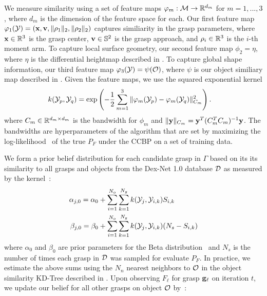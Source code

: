 We measure similarity using a set of feature maps $\varphi_m: \mathcal{M} \rightarrow \mathbb{R}^{d_m}$ for $m = 1, ..., 3$, where $d_m$ is the dimension of the feature space for each.
Our first feature map $\varphi_{1}(\mathcal{Y}) = (\mathbf{x}, \mathbf{v}, \| \rho_1 \|_2, \| \rho_2 \|_2)$ captures similiarity in the grasp parameters, where $\mathbf{x} \in \mathbb{R}^3$ is the grasp center, $\mathbf{v} \in \mathbb{S}^2$ is the grasp approach, and $\rho_i \in \mathbb{R}^3$ is the $i$-th moment arm.
To capture local surface geometry, our second feature map $\phi_{2} = \eta$, where $\eta$ is the differential heightmap described in .
To capture global shape information, our third feature map $\varphi_{3}(\mathcal{Y}) = \psi(\mathcal{O})$, where $\psi$ is our object similiary map described in .
Given the feature maps, we use the squared exponential kernel 
\begin{align*}
	k(\mathcal{Y}_p, \mathcal{Y}_q) &= \exp\left( - \frac{1}{2} \sum \limits_{m=1}^{3} \|\varphi_m(\mathcal{Y}_p) - \varphi_m(\mathcal{Y}_q)\|_{C_m}^2 \right).
\end{align*}
\noindent where $C_m \in \mathbb{R}^{d_m \times d_m}$ is the bandwidth for $\phi_m$ and $\| \mathbf{y} \|_{C_m} = \mathbf{y}^T (C_m^T C_m)^{-1} \mathbf{y}$.
The bandwidths are hyperparameters of the algorithm that are set by maximizing the log-likelihood~\cite{goetschalckx2011continuous} of the true $P_F$ under the CCBP on a set of training data.

We form a prior belief distribution for each candidate grasp in $\Gamma$ based on its its similarity to all grasps and objects from the Dex-Net 1.0 database $\mathcal{D}$ as measured by the kernel~\cite{goetschalckx2011continuous}:
\begin{align}
	\alpha_{j,0} = \alpha_{0} & + \sum \limits_{i=1}^{N_o} \sum \limits_{k=1}^{N_g} k(\mathcal{Y}_{j}, \mathcal{Y}_{i, k}) S_{i,k} \label{eq:alpha-prior} \\
	\beta_{j,0} = \beta_{0} & + \sum \limits_{i=1}^{N_o} \sum \limits_{k=1}^{N_g}  k(\mathcal{Y}_{j}, \mathcal{Y}_{i,k}) (N_s - S_{i,k}) \label{eq:beta-prior}
\end{align}
\noindent where $\alpha_{0}$ and $\beta_{0}$ are prior parameters for the Beta distribution~\cite{laskey2015bandits} and $N_s$ is the number of times each grasp in $\mathcal{D}$ was sampled for evaluate $P_F$.
In practice, we estimate the above sums using the $N_n$ nearest neighbors to $\mathcal{O}$ in the object similarity KD-Tree described in .
Upon observing $F_{\ell}$ for grasp $\mathbf{g}_{\ell}$ on iteration $t$, we update our belief for all other grasps on object $\mathcal{O}$ by~\cite{goetschalckx2011continuous}:

